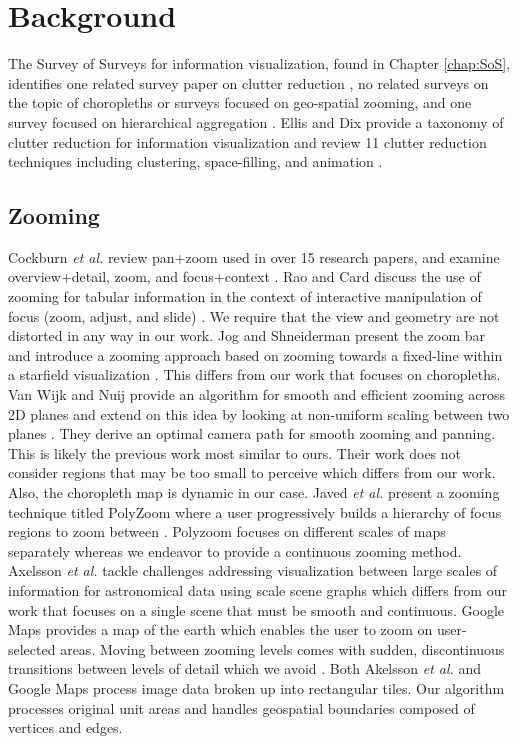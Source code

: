 \section{Background} \label{sec:relatedWork}
The Survey of Surveys for information visualization, found in Chapter \ref{chap:SoS}, identifies one related survey paper on clutter reduction  \cite{ellis2007taxonomy}, no related surveys on the topic of choropleths or surveys focused on geo-spatial zooming, and one survey focused on hierarchical aggregation \cite{elmqvist2010hierarchical}. Ellis and Dix provide a taxonomy of clutter reduction for information visualization and review 11 clutter reduction techniques including clustering, space-filling, and animation  \cite{ellis2007taxonomy}.

\subsection{Zooming}
Cockburn \textit{et al.} review pan+zoom used in over 15 research papers, and examine overview+detail, zoom, and focus+context \cite{cockburn2008review}.
Rao and Card discuss the use of zooming for tabular information in the context of interactive manipulation of focus (zoom, adjust, and slide) \cite{rao1994table}. We require that the view and geometry are not distorted in any way in our work. Jog and Shneiderman present the zoom bar and introduce a zooming approach based on zooming towards a fixed-line within a starfield visualization \cite{jog1995starfield}. This differs from our work that focuses on choropleths. Van Wijk and Nuij provide an algorithm for smooth and efficient zooming across 2D planes \cite{van2003smooth} and extend on this idea by looking at non-uniform scaling between two planes \cite{van2004model}. They derive an optimal camera path for smooth zooming and panning. This is likely the previous work most similar to ours. Their work does not consider regions that may be too small to perceive which differs from our work. Also, the choropleth map is dynamic in our case. Javed \textit{et al.} present a zooming technique titled PolyZoom where a user progressively builds a hierarchy of focus regions to zoom between \cite{javed2012polyzoom}. Polyzoom focuses on different scales of maps separately whereas we endeavor to provide a continuous zooming method. Axelsson \textit{et al.} tackle challenges addressing visualization between large scales of information for astronomical data using scale scene graphs \cite{axelsson2017dynamic} which differs from our work that focuses on a single scene that must be smooth and continuous. Google Maps provides a map of the earth which enables the user to zoom on user-selected areas. Moving between zooming levels comes with sudden, discontinuous transitions between levels of detail which we avoid \cite{googleMaps}. Both Akelsson \textit{et al.} and Google Maps process image data broken up into rectangular tiles. Our algorithm processes original unit areas and handles geospatial boundaries composed of vertices and edges.

